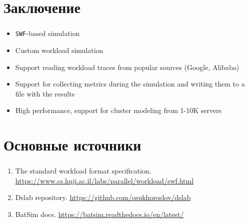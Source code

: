 \documentclass[t]{beamer}  %
\begin{document}
\begin{frame}[fragile]
	\frametitle{\insertsection} 
	\framesubtitle{\insertsubsection}
\end{frame}


	\section{Заключение}

	\begin{frame}[fragile]
		\frametitle{\insertsection} 
		\framesubtitle{\insertsubsection}
		\vspace{1cm}
		\begin{itemize}
			\item[\ding{51}] \texttt{SWF}-based simulation 
			\item Custom workload simulation
			\item Support reading workload traces from popular sources (Google, Alibaba)
			\item Support for collecting metrics during the simulation and writing them to a file with the results
			\item High performance, support for cluster modeling from 1-10K servers
		\end{itemize}

	\end{frame}

	\section{Основные источники}
	\begin{frame}
		\frametitle{\insertsection} 
		\framesubtitle{\insertsubsection}
		\vspace{1cm}	
		\begin{enumerate}
			\item The standard workload format specification. \url{https://www.cs.huji.ac.il/labs/parallel/workload/swf.html}
			\item Dslab repository. \url{https://github.com/osukhoroslov/dslab}
			\item BatSim docs. \url{https://batsim.readthedocs.io/en/latest/}
		\end{enumerate}
	\end{frame}
\end{document}
